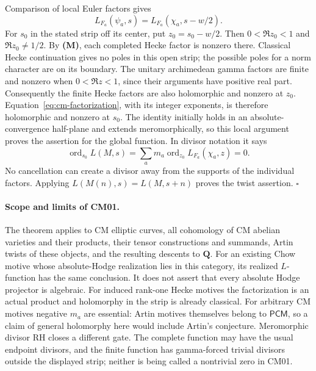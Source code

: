 \documentclass[11pt,a4paper]{article}
\theoremstyle{definition}
\begin{document}
Comparison of local Euler factors gives
\[
 L_{F_a}(\psi_a,s)=L_{F_a}(\chi_a,s-w/2).
\]
For $s_0$ in the stated strip off its center, put $z_0=s_0-w/2$.
Then $0<\Re z_0<1$ and $\Re z_0\ne1/2$.
By \textbf{(M)}, each completed Hecke factor is nonzero there. Classical
Hecke continuation gives no poles in this open strip; the possible poles
for a norm character are on its boundary. The unitary archimedean gamma
factors are finite and nonzero when $0<\Re z<1$, since their arguments
have positive real part. Consequently the finite Hecke factors are also
holomorphic and nonzero at $z_0$. Equation~\eqref{eq:cm-factorization}, with
its integer exponents, is therefore holomorphic and nonzero at $s_0$.
The identity initially holds in an absolute-convergence half-plane and
extends meromorphically, so this local argument proves the assertion for
the global function. In divisor notation it says
\[
 \operatorname{ord}_{s_0} L(M,s)
   =\sum_a m_a\operatorname{ord}_{z_0}L_{F_a}(\chi_a,z)=0.
\]
No cancellation can create a divisor away from the supports of the
individual factors. Applying $L(M(n),s)=L(M,s+n)$ proves the twist
assertion. \hfill$\square$

\paragraph{Scope and limits of CM01.}
The theorem applies to CM elliptic curves, all cohomology of CM abelian
varieties and their products, their tensor constructions and summands,
Artin twists of these objects, and the resulting descents to $\mathbf Q$.
For an existing Chow motive whose absolute-Hodge realization lies in this
category, its realized $L$-function has the same conclusion. It does not
assert that every absolute Hodge projector is algebraic.
For induced rank-one Hecke motives the factorization is an actual product
and holomorphy in the strip is already classical. For arbitrary CM motives
negative $m_a$ are essential: Artin motives themselves belong to
$\mathsf{PCM}$, so a claim of general holomorphy here would include
Artin's conjecture. Meromorphic divisor RH closes a different gate.
The complete function may have the usual endpoint divisors, and the finite
function has gamma-forced trivial divisors outside the displayed strip;
neither is being called a nontrivial zero in CM01.
\end{document}
